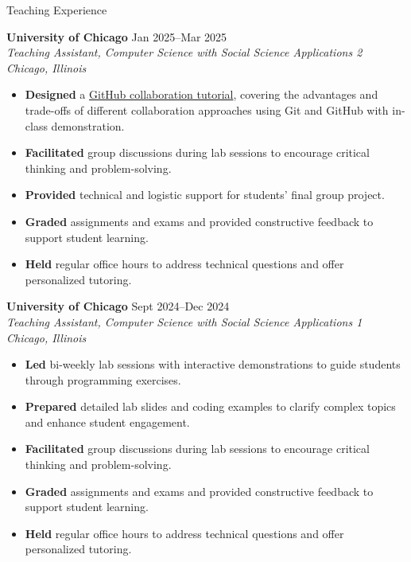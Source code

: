 \documentclass{resume} %
\begin{document}
\begin{rSection}{Teaching Experience}

\textbf{University of Chicago} \hfill {Jan 2025--Mar 2025} \\
\textit{Teaching Assistant, Computer Science with Social Science Applications 2} \hfill {\textit{Chicago, Illinois}}
\begin{itemize}
    \itemsep -5pt {}
    \item \textbf{Designed} a \href{https://github.com/cty20010831/Github_Collaboration_Demo}{GitHub collaboration tutorial}, covering the advantages and trade-offs of different collaboration approaches using Git and GitHub with in-class demonstration.
    \item \textbf{Facilitated} group discussions during lab sessions to encourage critical thinking and problem-solving.
    \item \textbf{Provided} technical and logistic support for students' final group project. 
    \item \textbf{Graded} assignments and exams and provided constructive feedback to support student learning.
    \item \textbf{Held} regular office hours to address technical questions and offer personalized tutoring.
\end{itemize}

\textbf{University of Chicago} \hfill {Sept 2024--Dec 2024} \\
\textit{Teaching Assistant, Computer Science with Social Science Applications 1} \hfill {\textit{Chicago, Illinois}}
\begin{itemize}
    \itemsep -5pt {}
    \item \textbf{Led} bi-weekly lab sessions with interactive demonstrations to guide students through programming exercises.
    \item \textbf{Prepared} detailed lab slides and coding examples to clarify complex topics and enhance student engagement.
    \item \textbf{Facilitated} group discussions during lab sessions to encourage critical thinking and problem-solving.
    \item \textbf{Graded} assignments and exams and provided constructive feedback to support student learning.
    \item \textbf{Held} regular office hours to address technical questions and offer personalized tutoring.
\end{itemize}
\end{rSection}
\end{document}
